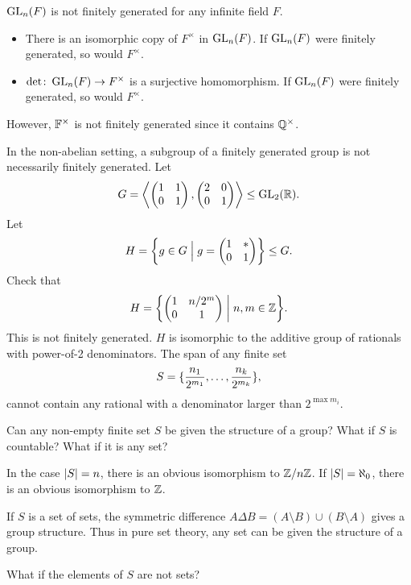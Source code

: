 \begin{examples}
    \item $\operatorname{GL}_n(F)$ is not finitely generated for any infinite field $F$.
    \begin{itemize}
        \item There is an isomorphic copy of $F^\times$ in $\operatorname{GL}_n(F)$.
            If $\operatorname{GL}_n(F)$ were finitely generated, so would $F^\times$.
        \item $\det\colon \operatorname{GL}_n(F) \to F^\times$ is a surjective
            homomorphism.
            If $\operatorname{GL}_n(F)$ were finitely generated, so would $F^\times$.
    \end{itemize}
    However, $\mathbb{F}^\times$ is not finitely generated since it contains
    $\mathbb{Q}^\times$.
    \item In the non-abelian setting, a subgroup of a finitely generated
        group is not necessarily finitely generated.
        Let \[
            G = \angled*{\begin{pmatrix}
                1 & 1 \\
                0 & 1
            \end{pmatrix}, \begin{pmatrix}
                2 & 0 \\
                0 & 1
            \end{pmatrix}} \le \GL_2(\R).
        \] Let \[
            H = \set*{g \in G \Bigm| g = \begin{pmatrix}
                1 & * \\
                0 & 1
            \end{pmatrix}} \le G.
        \]
        Check that \[
            H = \set*{\begin{pmatrix}
                1 & n/2^m \\
                0 & 1
            \end{pmatrix} \biggm| n, m \in \Z}.
        \] This is not finitely generated.
        $H$ is isomorphic to the additive group of rationals with power-of-2
        denominators.
        The span of any finite set \[
            S = \{\frac{n_1}{2^{m_1}}, \dots, \frac{n_k}{2^{m_k}}\},
        \]
        cannot contain any rational with a denominator larger than
        $2^{\max m_i}$.
\end{examples}

\begin{exercise}
    Can any non-empty finite set $S$ be given the structure of a group?
    What if $S$ is countable?
    What if it is any set?
\end{exercise}
\begin{solution}
    In the case $\lvert S\rvert = n$, there is an obvious isomorphism to $\mathbb{Z}/n\mathbb{Z}$.
    If $\lvert S\rvert = \aleph_0$, there is an obvious isomorphism to $\mathbb{Z}$.

    If $S$ is a set of sets, the symmetric difference
    $A \Delta B = (A \setminus B) \cup (B \setminus A)$
    gives a group structure.
    Thus in pure set theory, any set can be given the structure of a group.

    What if the elements of $S$ are not sets? %
\end{solution}

